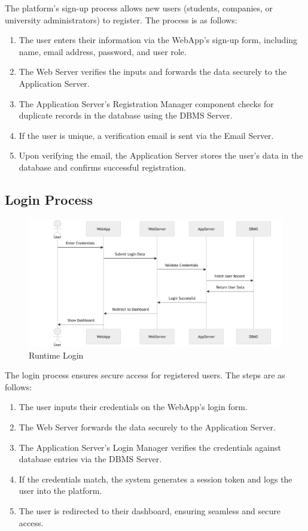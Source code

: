 The platform's sign-up process allows new users (students, companies, or university administrators) to register. The process is as follows:
\begin{enumerate}
    \item The user enters their information via the WebApp’s sign-up form, including name, email address, password, and user role.
    \item The Web Server verifies the inputs and forwards the data securely to the Application Server.
    \item The Application Server’s Registration Manager component checks for duplicate records in the database using the DBMS Server.
    \item If the user is unique, a verification email is sent via the Email Server.
    \item Upon verifying the email, the Application Server stores the user’s data in the database and confirms successful registration.
\end{enumerate}

\subsection{Login Process}
\label{subsec:login_process}

\begin{figure}[H]
    \begin{center}
        \includegraphics[width=0.82\linewidth]{JhaBhatiaSharma/imagesDD/LoginRuntime.png}
        \caption{Runtime Login}
        \label{fig:loginruntime}%
    \end{center}
\end{figure}

The login process ensures secure access for registered users. The steps are as follows:
\begin{enumerate}
    \item The user inputs their credentials on the WebApp’s login form.
    \item The Web Server forwards the data securely to the Application Server.
    \item The Application Server’s Login Manager verifies the credentials against database entries via the DBMS Server.
    \item If the credentials match, the system generates a session token and logs the user into the platform.
    \item The user is redirected to their dashboard, ensuring seamless and secure access.
\end{enumerate}

